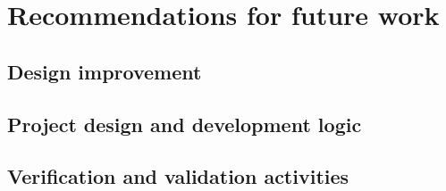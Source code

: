 \section{Recommendations for future work}\label{cha:futurework}

\subsection{Design improvement} \label{sec:improve}


\subsection{Project design and development logic} \label{sec:danddlogic}


%

\subsection{Verification and validation activities} \label{sec:futurevandv}

